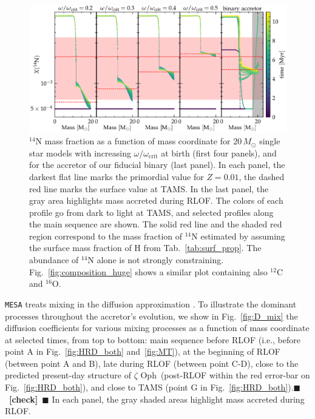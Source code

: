 \documentclass[twocolumn,twocolappendix,trackchanges]{aastex63}
\DeclareRobustCommand{\Figref}[1]{Fig.~\ref{#1}}
\DeclareRobustCommand{\Tabref}[1]{Tab.~\ref{#1}}
\newcommand{\zoph}{$\zeta$ Oph}
\newcommand{\todo}[1]{{\large $\blacksquare$~\textbf{\color{red}[#1]}}~$\blacksquare$}
\begin{document}
\begin{figure}[htbp]
  \centering
  \includegraphics[width=\textwidth]{n14_struct_complete_zeta_ab}
  \caption{$^{14}\mathrm{N}$ mass fraction as a function of mass
    coordinate for $20\,M_\odot$ single star models with increasing
    $\omega/\omega_\mathrm{crit}$ at birth (first four panels), and
    for the accretor of our fiducial binary (last panel). In each
    panel, the darkest flat line marks the primordial value for
    $Z=0.01$, the dashed red line marks the surface value at
    TAMS. In the last panel, the gray area highlights mass accreted
    during RLOF. The colors of each profile go from dark to light at
    TAMS, and selected profiles along the main sequence are shown. The
    solid red line and the shaded red region correspond to the mass
    fraction of $^{14}\mathrm{N}$ estimated by
     assuming the surface mass fraction of H
    from \Tabref{tab:surf_prop}. The abundance of $^{14}\mathrm{N}$
    alone is not strongly constraining. \Figref{fig:composition_huge}
    shows a similar plot containing also $^{12}\mathrm{C}$ and
    $^{16}\mathrm{O}$.}
  \label{fig:n14}
\end{figure}


\texttt{MESA} treats mixing in the diffusion approximation
\citep{paxton:11}.  To illustrate the dominant processes throughout
the accretor's evolution, we show in \Figref{fig:D_mix} the diffusion
coefficients for various mixing processes as a function of mass
coordinate at selected times, from top to bottom: main sequence before
RLOF (i.e., before point A in \Figref{fig:HRD_both} and\
\ref{fig:MT}), at the beginning of RLOF (between point A and B),
late during RLOF (between point C-D), close to the predicted
present-day structure of \zoph\ (post-RLOF within the red error-bar on
\Figref{fig:HRD_both}), and close to TAMS (point G in \Figref{fig:HRD_both}).\todo{check}
In each panel, the gray shaded areas highlight mass accreted during
RLOF.
\end{document}
